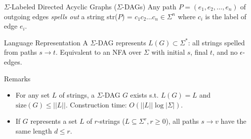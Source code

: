 \documentclass{beamer}
\begin{document}
\begin{frame}{$\Sigma$-Labeled Directed Acyclic Graphs ($\Sigma$-DAGs)}
    Any path $P = (e_1, e_2, \ldots, e_n)$ of outgoing edges \emph{spells out} a string str($P$) = $c_1c_2\ldots c_n \in \Sigma^n$ where $c_i$ is the label of edge $e_i$.

    \begin{block}{Language Representation}
        A $\Sigma$-DAG represents \( L(G) \subset \Sigma^* \): all strings spelled from paths \( s \to t \). Equivalent to an NFA over $\Sigma$ with initial \( s \), final \( t \), and no $\epsilon$-edges.
    \end{block}

    \begin{exampleblock}{Remarks}
        \begin{itemize}
            \item For any set \( L \) of strings, a $\Sigma$-DAG \( G \) exists s.t. \( L(G) = L \) and \( \text{size}(G) \leq ||L|| \). Construction time: \( O(||L|| \log |\Sigma|) \).
            \item If \( G \) represents a set \( L \) of \( r \)-strings ($L \subseteq \Sigma^r, r \geq 0$), all paths \( s \to v \) have the same length $d \leq r$.
        \end{itemize}
    \end{exampleblock}


\end{frame}
\end{document}
